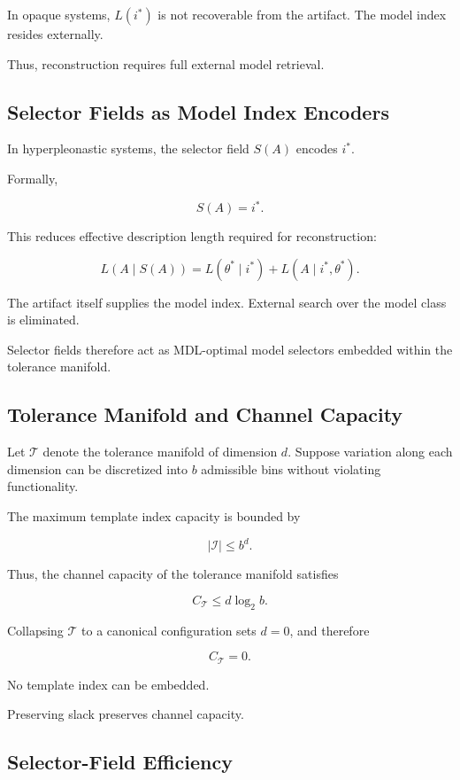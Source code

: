 \documentclass[11pt]{article}
\begin{document}
In opaque systems, $L(i^*)$ is not recoverable from the artifact.
The model index resides externally.

Thus, reconstruction requires full external model retrieval.

\subsection{Selector Fields as Model Index Encoders}

In hyperpleonastic systems, the selector field $S(A)$ encodes $i^*$.

Formally,

\[
S(A) = i^*.
\]

This reduces effective description length required for reconstruction:

\[
L(A \mid S(A)) = L(\theta^* \mid i^*) + L(A \mid i^*, \theta^*).
\]

The artifact itself supplies the model index.
External search over the model class is eliminated.

Selector fields therefore act as MDL-optimal model selectors
embedded within the tolerance manifold.

\subsection{Tolerance Manifold and Channel Capacity}

Let $\mathcal{T}$ denote the tolerance manifold of dimension $d$.
Suppose variation along each dimension can be discretized into
$b$ admissible bins without violating functionality.

The maximum template index capacity is bounded by

\[
|\mathcal{I}| \leq b^d.
\]

Thus, the channel capacity of the tolerance manifold satisfies

\[
C_{\mathcal{T}} \leq d \log_2 b.
\]

Collapsing $\mathcal{T}$ to a canonical configuration sets $d=0$,
and therefore

\[
C_{\mathcal{T}} = 0.
\]

No template index can be embedded.

Preserving slack preserves channel capacity.

\subsection{Selector-Field Efficiency}
\end{document}
